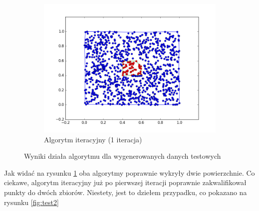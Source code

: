 \begin{figure}[h!]
    \begin{subfigure}[b]{0.5\linewidth}
        \includegraphics[width=\linewidth]{img/test1_3.png}
        \caption{Algorytm iteracyjny (1 iteracja)}
    \end{subfigure}%
    \caption{Wyniki działa algorytmu dla wygenerowanych danych testowych}
    \label{fig:test1}
\end{figure}

Jak widać na rysunku \ref{fig:test1} oba algorytmy poprawnie wykryły dwie powierzchnie. Co ciekawe,
algorytm iteracyjny już po pierwszej iteracji poprawnie zakwalifikował punkty do dwóch zbiorów. Niestety, jest to
dziełem przypadku, co pokazano na rysunku \ref{fig:test2}

